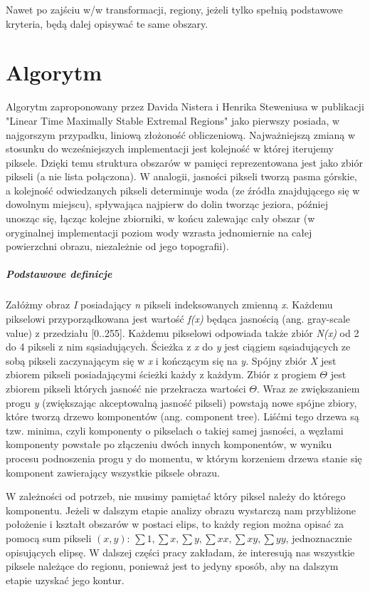 Nawet po zajściu w/w transformacji, regiony, jeżeli tylko spełnią podstawowe
kryteria, będą dalej opisywać te same obszary.

\section{Algorytm}

Algorytm zaproponowany przez Davida Nistera i Henrika Steweniusa w publikacji
"Linear Time Maximally Stable Extremal Regions" \cite{Nister_Stewenius_2008}
jako pierwszy posiada, w najgorszym przypadku, liniową złożoność obliczeniową.
Najważniejszą zmianą w stosunku do wcześniejszych implementacji jest kolejność
w której iterujemy piksele. Dzięki temu struktura obszarów w pamięci
reprezentowana jest jako zbiór pikseli (a nie lista połączona). W analogii,
jasności pikseli tworzą pasma górskie, a kolejność odwiedzanych pikseli
determinuje woda (ze źródła znajdującego się w dowolnym miejscu), spływająca
najpierw do dolin tworząc jeziora, później unosząc się, łącząc kolejne
zbiorniki, w końcu zalewając cały obszar (w oryginalnej implementacji poziom
wody wzrasta jednomiernie na całej powierzchni obrazu, niezależnie od jego
topografii).

\subparagraph{Podstawowe definicje}

Załóżmy obraz \textit{I} posiadający \textit{n} pikseli indeksowanych zmienną
\textit{x}. Każdemu pikselowi przyporządkowana jest wartość \textit{f(x)}
będąca jasnością (ang. gray-scale value) z przedziału [0..255]. Każdemu
pikselowi odpowiada także zbiór \textit{N(x)} od 2 do 4 pikseli z nim
sąsiadujących. Ścieżka z \textit{x} do \textit{y} jest ciągiem sąsiadujących ze
sobą pikseli zaczynającym się w \textit{x} i kończącym się na \textit{y}.
Spójny zbiór \textit{X} jest zbiorem pikseli posiadającymi ścieżki każdy z
każdym. Zbiór z progiem $\Theta$ jest zbiorem pikseli których jasność nie
przekracza wartości $\Theta$. Wraz ze zwiększaniem progu \textit{y} (zwiększając
akceptowalną jasność pikseli) powstają nowe spójne zbiory, które tworzą drzewo
komponentów (ang. component tree). Liśćmi tego drzewa są tzw. minima, czyli
komponenty o pikselach o takiej samej jasności, a węzłami komponenty powstałe
po złączeniu dwóch innych komponentów, w wyniku procesu podnoszenia progu y do
momentu, w którym korzeniem drzewa stanie się komponent zawierający wszystkie
piksele obrazu.

W zależności od potrzeb, nie musimy pamiętać który piksel należy do którego
komponentu. Jeżeli w dalszym etapie analizy obrazu wystarczą nam przybliżone
położenie i kształt obszarów w postaci elips, to każdy region można opisać za
pomocą sum pikseli $(x,y)$: $\sum{1}, \sum{x}, \sum{y}, \sum{xx}, \sum{xy}, \sum{yy}$,
jednoznacznie opisujących elipsę. W dalszej części pracy zakładam, że
interesują nas wszystkie piksele należące do regionu, ponieważ jest to jedyny
sposób, aby na dalszym etapie uzyskać jego kontur.

